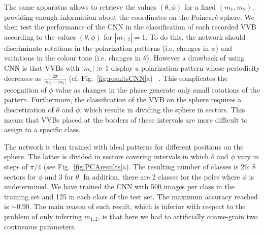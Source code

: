 The same apparatus allows to retrieve the values $(\theta,\phi)$ for a fixed $(m_1, m_2)$,
providing enough information about the coordinates on the Poincar\'e sphere. We then test the performance of the CNN in the classification of each recorded \ac{VVB} according to the values $(\theta,\phi)$ for $|m_{1,2}|=1$. To do this, the network should discriminate rotations in the polarization patterns (i.e. changes in $\phi$) and variations in the colour tone (i.e. changes in $\theta$). However a drawback of using CNN is that \ac{VVB}s with $|m_i|\gg1$ display a polarization pattern whose periodicity decreases as $\frac{2\pi}{|m_1-m_2|}$ (cf. Fig.~\ref{fig:resultsCNN}a)~ \cite{fickler2012quantum,dambrosio_gear2013}. This complicates the recognition of $\phi$ value as changes in the phase generate only small rotations of the pattern. Furthermore, the classification of the VVB on the sphere requires a discretization of  $\theta$ and $\phi$, which results in dividing the sphere in sectors. This means that VVBs placed at the borders of these intervals are more difficult to assign to a specific class.

The network is then trained with ideal patterns for different positions on the sphere. The latter is divided in sectors covering intervals in which $\theta$ and $\phi$ vary in steps of $\pi/4$ (see Fig.~\ref{fig:PCAresults}a). The resulting number of classes is $26$: 8 sectors for $\phi$ and 3 for $\theta$. In addition, there are 
2 classes for the poles where $\phi$ is undetermined. We have trained the CNN with 500 images per class in the training set and 125 in each class of the test set. The maximum accuracy reached is $\sim 0.90$. The main reason of such result, which is inferior with respect to the problem of only inferring $m_{1,2}$, is that here we had to artificially coarse-grain two continuous parameters. 



